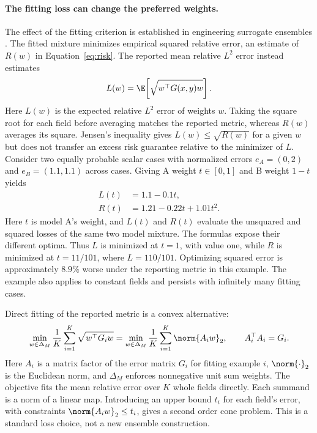 \paragraph{The fitting loss can change the preferred weights.}
The effect of the fitting criterion is established in engineering surrogate
ensembles \citep{acar2009}.
The fitted mixture minimizes empirical squared relative error, an estimate of
$R(w)$ in Equation~\eqref{eq:risk}. The reported mean relative $L^2$ error
instead estimates
\begin{equation}
 L(w)=\E\!\left[\sqrt{w^\top G(x,y)w}\right].
\label{eq:reportedrisk}
\end{equation}
Here $L(w)$ is the expected relative $L^2$ error of weights $w$. Taking the
square root for each field before averaging matches the reported metric,
whereas $R(w)$ averages its square.
Jensen's inequality gives $L(w)\leq\sqrt{R(w)}$ for a given $w$ but does not
transfer an excess risk guarantee relative to the minimizer of $L$.
Consider two equally probable scalar cases with normalized errors
$e_A=(0,2)$ and $e_B=(1.1,1.1)$ across cases. Giving A weight $t\in[0,1]$
and B weight $1-t$ yields
\begin{align}
 L(t)&=1.1-0.1t,\\
 R(t)&=1.21-0.22t+1.01t^2.
\end{align}
Here $t$ is model A's weight, and $L(t)$ and $R(t)$ evaluate the unsquared and
squared losses of the same two model mixture. The formulas expose their different optima.
Thus $L$ is minimized at $t=1$, with value one, while $R$ is minimized at
$t=11/101$, where $L=110/101$. Optimizing squared error is approximately
$8.9\%$ worse under the reporting metric in this example. The example also
applies to constant fields and persists with infinitely many fitting cases.

Direct fitting of the reported metric is a convex alternative:
\begin{equation}
 \min_{w\in\Delta_M}\frac{1}{K}\sum_{i=1}^{K}\sqrt{w^\top G_iw}
 =\min_{w\in\Delta_M}\frac{1}{K}\sum_{i=1}^{K}\norm{A_iw}_2,
 \qquad A_i^\top A_i=G_i.
\label{eq:metricfit}
\end{equation}
Here $A_i$ is a matrix factor of the error matrix $G_i$ for fitting example $i$, $\norm{\cdot}_2$
is the Euclidean norm, and $\Delta_M$ enforces nonnegative unit sum weights.
The objective fits the mean relative error over $K$ whole fields directly.
Each summand is a norm of a linear map. Introducing an upper bound $t_i$ for
each field's error, with constraints $\norm{A_iw}_2\leq t_i$, gives a second order cone problem.
This is a standard loss choice, not a new ensemble construction.

